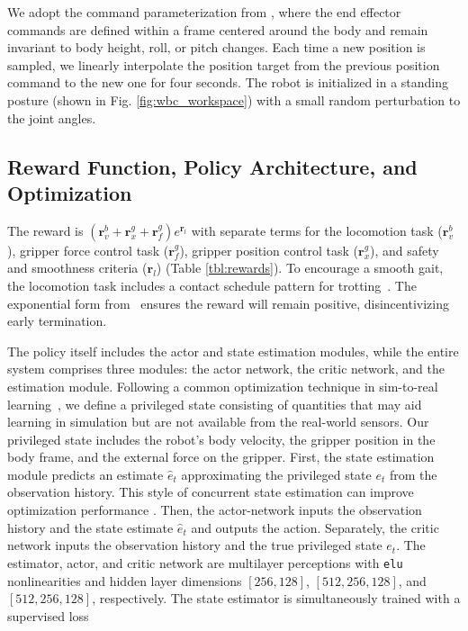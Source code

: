We adopt the command parameterization from \cite{fu2023deep}, where the end effector commands are defined within a frame centered around the body and remain invariant to body height, roll, or pitch changes. Each time a new position is sampled, we linearly interpolate the position target from the previous position command to the new one for four seconds.
The robot is initialized in a standing posture (shown in Fig. \ref{fig:wbc_workspace}) with a small random perturbation to the joint angles. 

\subsection{Reward Function, Policy Architecture, and Optimization}
\label{sec:policy_arch}

The reward is ${(\mathbf{r}_v^b + \mathbf{r}_x^g + \mathbf{r}_f^g)e^{\mathbf{r}_l }}$ with separate terms for the locomotion task ($\mathbf{r}_v^b$), gripper force control task ($\mathbf{r}_f^g$), gripper position control task ($\mathbf{r}_x^g$), and safety and smoothness criteria ($\mathbf{r}_l$) (Table \ref{tbl:rewards}). To encourage a smooth gait, the locomotion task includes a contact schedule pattern for trotting~\cite{margolis2022walktheseways}. The exponential form from~\cite{ji2022concurrent} ensures the reward will remain positive, disincentivizing early termination.

The policy itself includes the actor and state estimation modules, while the entire system comprises three modules: the actor network, the critic network, and the estimation module.
Following a common optimization technique in sim-to-real learning~\cite{chen2020learning, ji2022concurrent}, we define a privileged state consisting of quantities that may aid learning in simulation but are not available from the real-world sensors. Our privileged state includes the robot's body velocity, the gripper position in the body frame, and the external force on the gripper.
First, the state estimation module predicts an estimate $\hat{e}_t$ approximating the privileged state $e_t$ from the observation history. This style of concurrent state estimation can improve optimization performance \cite{ji2022concurrent}. Then, the actor-network inputs the observation history and the state estimate $\hat{e}_t$ and outputs the action. Separately, the critic network inputs the observation history and the true privileged state $e_t$. The estimator, actor, and critic network are multilayer perceptions with \texttt{elu} nonlinearities and hidden layer dimensions $[256, 128]$, $[512, 256, 128]$, and $[512, 256, 128]$, respectively. The state estimator is simultaneously trained with a supervised loss 


